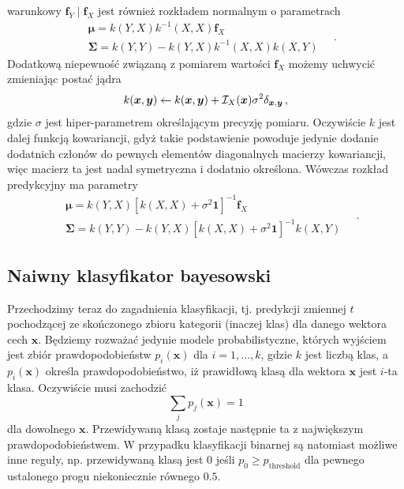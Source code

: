 \documentclass{myclass}
\numberwithin{equation}{subsection}
\begin{document}
warunkowy \(\bm{f}_Y\mid \bm{f}_X\) jest również rozkładem normalnym o parametrach
\[
\begin{split}
&\bm{\mu} = k(Y,X)k^{-1}(X,X)\bm{f}_X\\
&\bm{\Sigma} = k(Y,Y) - k(Y,X)k^{-1}(X,X)k(X,Y)
\end{split}\quad.
\]
Dodatkową niepewność związaną z pomiarem wartości \(\bm{f}_X\) możemy uchwycić zmieniając postać
jądra 
\[
k(\bm{x},\bm{y}) \leftarrow k(\bm{x},\bm{y}) + \mathcal{I}_X(\bm{x})\sigma^2\delta_{\bm{x},\bm{y}}\,,
\]
gdzie \(\sigma\) jest hiper-parametrem określającym precyzję pomiaru. Oczywiście \(k\) jest dalej
funkcją kowariancji, gdyż takie podstawienie powoduje jedynie dodanie dodatnich członów do pewnych
elementów diagonalnych macierzy kowariancji, więc macierz ta jest nadal symetryczna i dodatnio
określona. Wówczas rozkład predykcyjny ma parametry
\[
\boxed{
\begin{split}
&\bm{\mu} = k(Y,X)\left[k(X,X) + \sigma^2\bm{1}\right]^{-1}\bm{f}_X\\
&\bm{\Sigma} = k(Y,Y) - k(Y,X)\left[k(X,X) + \sigma^2\bm{1}\right]^{-1}k(X,Y)
\end{split}\quad.
}
\]


\subsection{Naiwny klasyfikator bayesowski}

Przechodzimy teraz do zagadnienia klasyfikacji, tj. predykcji zmiennej \(t\) pochodzącej ze
skończonego zbioru kategorii (inaczej klas) dla danego wektora cech \(\bm{x}\). Będziemy rozważać
jedynie modele probabilistyczne, których wyjściem jest zbiór prawdopodobieństw \(p_i(\bm{x})\) dla
\(i = 1,\ldots,k\), gdzie \(k\) jest liczbą klas, a \(p_i(\bm{x})\) określa prawdopodobieństwo, iż
prawidłową klasą dla wektora \(\bm{x}\) jest \(i\)-ta klasa. Oczywiście musi zachodzić
\[
\sum_j p_j(\bm{x}) = 1
\]
dla dowolnego \(\bm{x}\). Przewidywaną klasą zostaje następnie ta z największym prawdopodobieństwem.
W przypadku klasyfikacji binarnej są natomiast możliwe inne reguły, np. przewidywaną klasą jest 0
jeśli \(p_0 \geq p_\text{threshold}\) dla pewnego ustalonego progu niekoniecznie równego \(0.5\).
\end{document}
